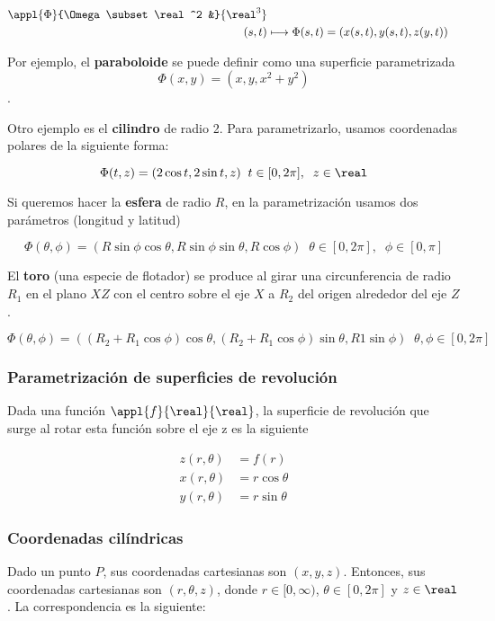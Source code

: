 \documentclass[12pt,a4paper,titlepage]{apuntes}
\begin{document}
\begin{align*} \appl{\Phi}{\Omega \subset \real^2 &}{\real^3} \\
 (s,t) &\longmapsto \Phi(s,t) = (x(s,t), y(s,t), z(y,t)) \end{align*}

Por ejemplo, el \textbf{paraboloide} se puede definir como una superficie parametrizada \[\Phi(x,y) = (x,y,x^2+y^2)\].

Otro ejemplo es el \textbf{cilindro} de radio 2. Para parametrizarlo, usamos coordenadas polares de la siguiente forma:

\[ \Phi(t,z) = (2\cos t, 2\sin t, z)\;\;t\in [0, 2\pi],\;\; z\in \real \]

Si queremos hacer la \textbf{esfera} de radio $R$, en la parametrización usamos dos parámetros (longitud y latitud)

\[ \Phi(\theta, \phi) = (R\sin\phi\cos\theta, R\sin\phi\sin\theta, R\cos\phi)\;\; \theta\in[0,2\pi],\;\;\phi\in[0, \pi] \]

El \textbf{toro} (una especie de flotador) se produce al girar una circunferencia de radio $R_1$ en el plano $XZ$ con el centro sobre el eje $X$ a $R_2$ del origen alrededor del eje $Z$.

\[ \Phi(\theta, \phi) = ((R_2+R_1\cos\phi)\cos\theta,(R_2+R_1\cos\phi)\sin \theta,R1\sin \phi)\;\; \theta, \phi \in [0, 2\pi] \]

\subsubsection{Parametrización de superficies de revolución}

Dada una función $\appl{f}{\real}{\real}$, la superficie de revolución que surge al rotar esta función sobre el eje z es la siguiente

\begin{align*} z(r,\theta) &= f(r) \\
x(r,\theta) &= r \cos \theta \\
y(r,\theta) &= r \sin \theta \end{align*} 

\subsubsection{Coordenadas cilíndricas}
Dado un punto $P$, sus coordenadas cartesianas son $(x,y,z)$. Entonces, sus coordenadas cartesianas son $(r,\theta, z)$, donde $r\in [0,\infty)$, $\theta \in [0,2\pi]$ y $z\in \real$. La correspondencia es la siguiente:
\end{document}
